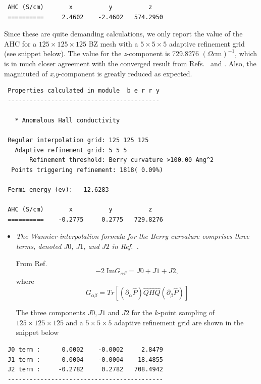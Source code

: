 \begin{itemize}
\begin{tcolorbox}[title=With adaptive refinement,sharp corners,boxrule=0.5pt]
{\begin{verbatim}
 AHC (S/cm)       x          y          z
 ==========     2.4602    -2.4602   574.2950
\end{verbatim}
}
\end{tcolorbox}

Since these are quite demanding calculations, we only report the value of the AHC for a $125\times125\times125$ BZ mesh with a $5\times5\times5$ adaptive refinement grid (see snippet below). The value for the \textit{z}-component is 729.8276 $(\Omega \mathrm{cm})^{-1}$, which is in much closer agreement with the converged result from Refs.~ and . Also, the magnituted of \textit{x,y}-component is greatly reduced as expected. 

\begin{tcolorbox}[title={$125\times125\times125$ BZ mesh with a $5\times5\times5$ adaptive refinement grid}]
{\small
\begin{verbatim}
 Properties calculated in module  b e r r y
 ------------------------------------------

   * Anomalous Hall conductivity
  
 Regular interpolation grid: 125 125 125
   Adaptive refinement grid: 5 5 5
       Refinement threshold: Berry curvature >100.00 Ang^2
  Points triggering refinement: 1818( 0.09%)

 Fermi energy (ev):   12.6283

 AHC (S/cm)       x          y          z
 ==========    -0.2775     0.2775   729.8276
\end{verbatim}
}
\end{tcolorbox} 
\end{itemize}

\begin{itemize}
	\item {\it The Wannier-interpolation formula for the Berry curvature comprises three terms, denoted $J0$, $J1$, and $J2$ in Ref.~.}

From Ref.~
\begin{equation}
-2\;\mathrm{Im} G_{\alpha\beta} = J0 + J1 + J2, 
\end{equation}
where 
\begin{equation}
G_{\alpha\beta} = Tr[(\partial_\alpha \hat{P})\hat{Q}\hat{H}\hat{Q}(\partial_\beta\hat{P})]
\end{equation}

The three components $J0, J1$ and $J2$ for the $k$-point sampling of $125\times125\times125$ and a $5\times5\times5$ adaptive refinement grid are shown in the snippet below 
\end{itemize}
\begin{tcolorbox}[sharp corners,boxrule=0.5pt]
{\small
\begin{verbatim}
 J0 term :      0.0002    -0.0002     2.8479
 J1 term :      0.0004    -0.0004    18.4855
 J2 term :     -0.2782     0.2782   708.4942
 -------------------------------------------
\end{verbatim}
}
\end{tcolorbox}

